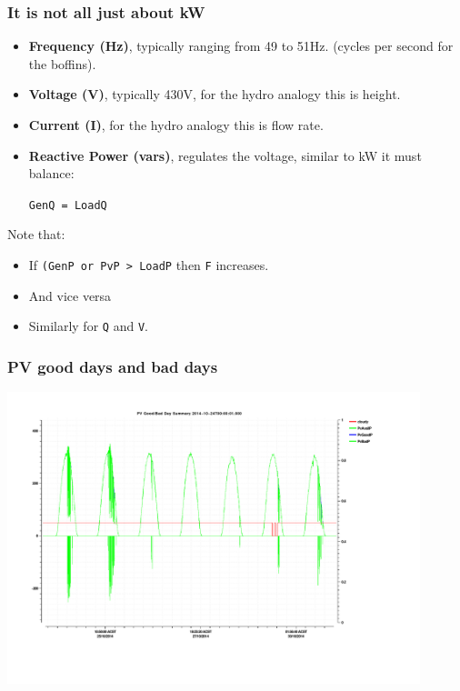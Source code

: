 \documentclass{beamer}
\begin{document}
\begin{frame}\frametitle{It is not all just about kW}
  \begin{itemize}
  \item \textbf{Frequency (Hz)}, typically ranging from 49 to 51Hz.
    (cycles per second for the boffins).
  \item \textbf{Voltage (V)}, typically 430V, for the hydro analogy
    this is height.
  \item \textbf{Current (I)}, for the hydro analogy this is flow rate.
    \pause
  \item \textbf{Reactive Power (vars)}, regulates the voltage, similar
    to kW it must balance:
    
    \texttt{GenQ = LoadQ}
  \end{itemize}
  Note that:
  \begin{itemize}
  \item If \texttt{(GenP or PvP > LoadP} then \texttt{F} increases.
  \item And vice versa
  \item Similarly for \texttt{Q} and \texttt{V}.
  \end{itemize}
\end{frame}

\begin{frame}\frametitle{PV good days and bad days}
  \includegraphics[width=12cm]{stuff/gday.pdf}
\end{frame}
\end{document}
